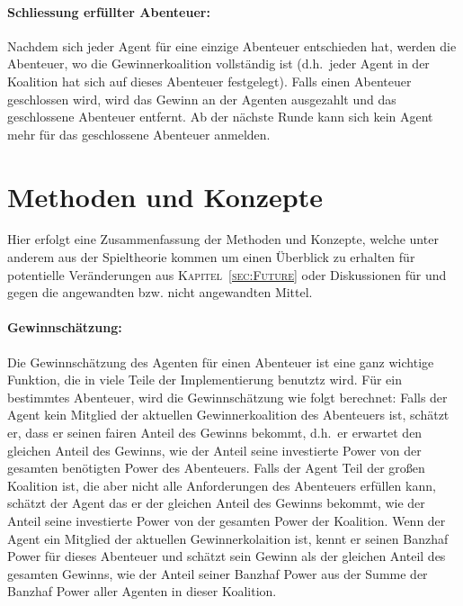 \documentclass[fleqn,10pt]{SelfArx} %
\newcommand{\ChapterCite}[1]{\textsc{Kapitel~\ref{#1}}}
\begin{document}
\paragraph{Schliessung erfüllter Abenteuer:}
Nachdem sich jeder Agent für eine einzige Abenteuer entschieden hat, werden die Abenteuer, wo die Gewinnerkoalition vollständig ist (d.h.\ jeder Agent in der Koalition hat sich auf dieses Abenteuer festgelegt). Falls einen Abenteuer geschlossen wird, wird das Gewinn an der Agenten ausgezahlt und das geschlossene Abenteuer entfernt. Ab der nächste Runde kann sich kein Agent mehr für das geschlossene Abenteuer anmelden.

\section{Methoden und Konzepte}
\label{sec:Methoden}
Hier erfolgt eine Zusammenfassung der Methoden und Konzepte, welche unter anderem aus der Spieltheorie kommen um einen Überblick zu erhalten für potentielle Veränderungen aus \ChapterCite{sec:Future} oder Diskussionen für und gegen die angewandten bzw. nicht angewandten Mittel.

\paragraph{Gewinnschätzung:}
Die Gewinnschätzung des Agenten für einen Abenteuer ist eine ganz wichtige Funktion, die in viele Teile der Implementierung benutztz wird.
Für ein bestimmtes Abenteuer, wird die Gewinnschätzung wie folgt berechnet: Falls der Agent kein Mitglied der aktuellen Gewinnerkoalition des Abenteuers ist, schätzt er, dass er seinen fairen Anteil des Gewinns bekommt, d.h.\ er erwartet den gleichen Anteil des Gewinns, wie der Anteil seine investierte Power von der gesamten benötigten Power des Abenteuers. Falls der Agent Teil der großen Koalition ist, die aber nicht alle Anforderungen des Abenteuers erfüllen kann, schätzt der Agent das er der gleichen Anteil des Gewinns bekommt, wie der Anteil seine investierte Power von der gesamten Power der Koalition. Wenn der Agent ein Mitglied der aktuellen Gewinnerkolaition ist, kennt er seinen Banzhaf Power für dieses Abenteuer und schätzt sein Gewinn als der gleichen Anteil des gesamten Gewinns, wie der Anteil seiner Banzhaf Power aus der Summe der Banzhaf Power aller Agenten in dieser Koalition.
\end{document}
